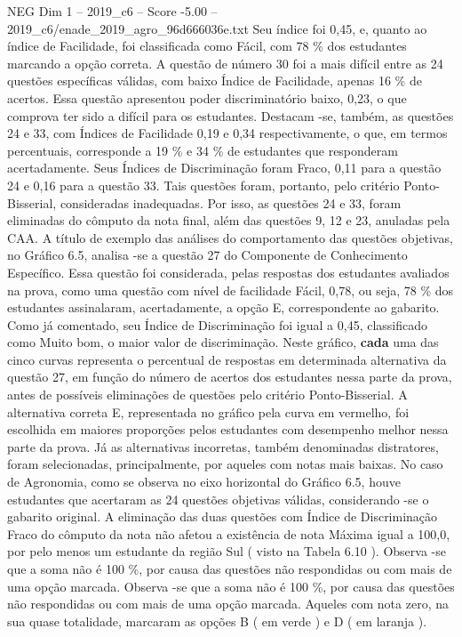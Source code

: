 \begin{textsample}{NEG Dim 1 – 2019\_c6 – Score -5.00 – 2019\_c6/enade\_2019\_agro\_96d666036e.txt}
Seu índice foi 0,45, e, quanto ao índice de Facilidade, foi classificada como Fácil, com 78 \% dos estudantes marcando a opção correta.
A questão de número 30 foi a mais difícil entre as 24 questões específicas válidas, com baixo Índice de Facilidade, apenas 16 \% de acertos.
Essa questão apresentou poder discriminatório baixo, 0,23, o que comprova ter sido a difícil para os estudantes.
Destacam -se, também, as questões 24 e 33, com Índices de Facilidade 0,19 e 0,34 respectivamente, o que, em termos percentuais, corresponde a 19 \% e 34 \% de estudantes que responderam acertadamente.
Seus Índices de Discriminação foram Fraco, 0,11 para a questão 24 e 0,16 para a questão 33.
Tais questões foram, portanto, pelo critério Ponto-Bisserial, consideradas inadequadas.
Por isso, as questões 24 e 33, foram eliminadas do cômputo da nota final, além das questões 9, 12 e 23, anuladas pela CAA.
A título de exemplo das análises do comportamento das questões objetivas, no Gráfico 6.5, analisa -se a questão 27 do Componente de Conhecimento Específico.
Essa questão foi considerada, pelas respostas dos estudantes avaliados na prova, como uma questão com nível de facilidade Fácil, 0,78, ou seja, 78 \% dos estudantes assinalaram, acertadamente, a opção E, correspondente ao gabarito.
Como já comentado, seu Índice de Discriminação foi igual a 0,45, classificado como Muito bom, o maior valor de discriminação.
Neste gráfico, \textbf{cada} uma das cinco curvas representa o percentual de respostas em determinada alternativa da questão 27, em função do número de acertos dos estudantes nessa parte da prova, antes de possíveis eliminações de questões pelo critério Ponto-Bisserial.
A alternativa correta E, representada no gráfico pela curva em vermelho, foi escolhida em maiores proporções pelos estudantes com desempenho melhor nessa parte da prova.
Já as alternativas incorretas, também denominadas distratores, foram selecionadas, principalmente, por aqueles com notas mais baixas.
No caso de Agronomia, como se observa no eixo horizontal do Gráfico 6.5, houve estudantes que acertaram as 24 questões objetivas válidas, considerando -se o gabarito original.
A eliminação das duas questões com Índice de Discriminação Fraco do cômputo da nota não afetou a existência de nota Máxima igual a 100,0, por pelo menos um estudante da região Sul ( visto na Tabela 6.10 ).
Observa -se que a soma não é 100 \%, por causa das questões não respondidas ou com mais de uma opção marcada.
Observa -se que a soma não é 100 \%, por causa das questões não respondidas ou com mais de uma opção marcada.
Aqueles com nota zero, na sua quase totalidade, marcaram as opções B ( em verde ) e D ( em laranja ).

\end{textsample}
